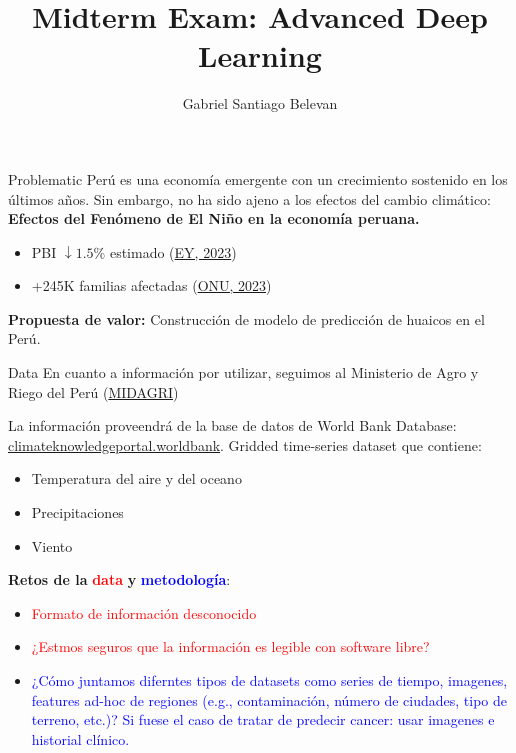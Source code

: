 \documentclass[10pt]{beamer}
\title[Midterm Exam: DLA2501]{Midterm Exam: Advanced Deep Learning}
\author{Gabriel Santiago Belevan}
\begin{document}
\begin{frame}
\titlepage
\end{frame}

\begin{frame}{Problematic}
Perú es una economía emergente con un crecimiento sostenido en los últimos años. Sin embargo, no ha sido ajeno a los efectos del cambio climático:\\
\vspace{0.5cm}
\textbf{Efectos del Fenómeno de El Niño en la economía peruana.}
\begin{itemize}
    \item PBI $\downarrow 1.5\%$ estimado  (\href{https://acortar.link/KPBUJg}{EY, 2023})
    \item +245K familias afectadas (\href{https://acortar.link/TkdufF}{ONU, 2023})
\end{itemize}

\vspace{0.5cm}
\textbf{Propuesta de valor:}
Construcción de modelo de predicción de huaicos en el Perú.

\end{frame}

\begin{frame}{Data}
En cuanto a información por utilizar, seguimos al Ministerio de Agro y Riego del Perú (\href{https://acortar.link/PQVWFQ}{MIDAGRI})

La información proveendrá de la base de datos de World Bank Database: \href{https://climateknowledgeportal.worldbank.org/country/peru/climate-data-historical}{climateknowledgeportal.worldbank}. Gridded time-series dataset que contiene: 
\begin{itemize}
    \item Temperatura del aire y del oceano
    \item Precipitaciones
    \item Viento
\end{itemize}
\vspace{0.5cm}

\textbf{Retos de la }\textcolor{red}{\textbf{data}} \textbf{y} \textcolor{blue}{\textbf{metodología}}: 
\begin{itemize}
    \item \textcolor{red}{Formato de información desconocido}
    \item\textcolor{red}{¿Estmos seguros que la información es legible con software libre?}
    \item \textcolor{blue}{¿Cómo juntamos diferntes tipos de datasets como series de tiempo, imagenes, features ad-hoc de regiones (e.g., contaminación, número de ciudades, tipo de terreno, etc.)? Si fuese el caso de tratar de predecir cancer: usar imagenes e historial clínico.}
\end{itemize}

\end{frame}
\end{document}
